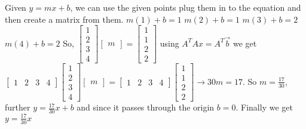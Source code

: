 			Given $y=mx+b$, we can use the given points plug them in to the equation and then create a matrix from them.
			\newline
			$m(1)+b=1$
			\newline
			$m(2)+b=1$
			\newline
			$m(3)+b=2$
			\newline
			$m(4)+b=2$
			\newline
			So, $\begin{bmatrix}
			    1 \\ 2 \\ 3 \\ 4
			\end{bmatrix} 
			\begin{bmatrix}
			    m
			\end{bmatrix}=
			\begin{bmatrix}
			    1 \\ 1 \\ 2 \\ 2
			\end{bmatrix}$
			\newline
			using $A^TAx=A^T\vec{b}$ we get 
			\newline
			$\begin{bmatrix}
			    1 & 2 & 3 & 4
			\end{bmatrix}
			\begin{bmatrix}
			    1 \\ 2 \\ 3 \\ 4
			\end{bmatrix}
			\begin{bmatrix}
			    m
			\end{bmatrix}=\begin{bmatrix}
			    1 & 2 & 3 & 4
			\end{bmatrix}
			\begin{bmatrix}
			    1 \\ 1 \\ 2 \\2
			\end{bmatrix} \rightarrow 30m=17$.
			\newline
			So $m=\frac{17}{30}$, further $y=\frac{17}{30}x+b$ and since it passes through the origin $b=0$. Finally we get $y=\frac{17}{30}x$
			
